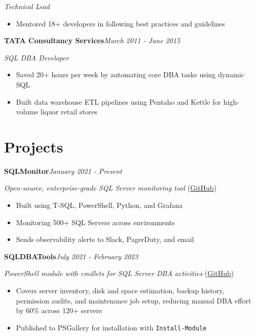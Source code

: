 \documentclass[10pt,a4paper]{article}
\begin{document}
\textit{Technical Lead}\\[-5pt]
\begin{itemize}
  \item Mentored 18+ developers in following best practices and guidelines
\end{itemize}
\vspace{14.7pt}
\noindent\textbf{TATA Consultancy Services}\hfill \textit{March 2011 - June 2015}

\textit{SQL DBA Developer}\\[-5pt]
\begin{itemize}
  \item Saved 20+ hours per week by automating core DBA tasks using dynamic SQL
  \item Built data warehouse ETL pipelines using Pentaho and Kettle for high-volume liquor retail stores
\end{itemize}

\section{Projects}

\noindent\textbf{SQLMonitor}\hfill \textit{January 2021 - Present}

\textit{Open-source, enterprise-grade SQL Server monitoring tool} (\href{https://github.com/imajaydwivedi/SQLMonitor}{GitHub})
\begin{itemize}
  \item Built using T-SQL, PowerShell, Python, and Grafana
  \item Monitoring 500+ SQL Servers across environments
  \item Sends observability alerts to Slack, PagerDuty, and email
\end{itemize}
\vspace{14.7pt}
\noindent\textbf{SQLDBATools}\hfill \textit{July 2021 - February 2023}

\textit{PowerShell module with cmdlets for SQL Server DBA activities} (\href{https://github.com/imajaydwivedi/SQLDBATools}{GitHub})
\begin{itemize}
  \item Covers server inventory, disk and space estimation, backup history, permission audits, and maintenance job setup, reducing manual DBA effort by 60\% across 120+ servers
  \item Published to PSGallery for installation with \texttt{Install-Module}
\end{itemize}
\end{document}
